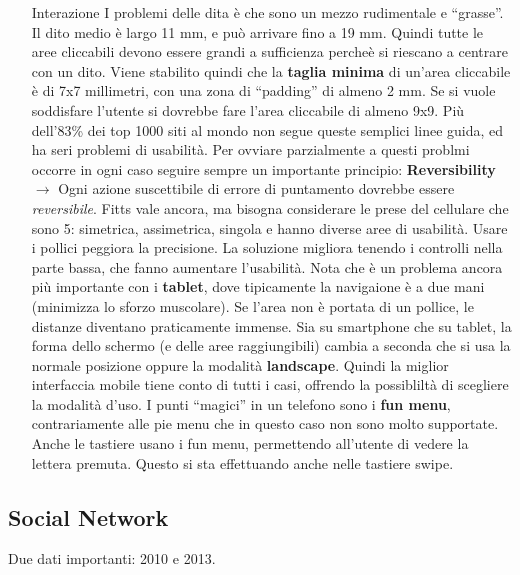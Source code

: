 \begin{enumerate}

\item[Interazione] I problemi delle dita \`e che sono un mezzo rudimentale e ``grasse''. Il dito medio \`e largo 11 mm, e pu\`o arrivare fino a 19 mm. Quindi tutte le aree cliccabili devono essere grandi a sufficienza perche\`e si riescano a centrare con un dito. Viene stabilito quindi che la \textbf{taglia minima} di un'area cliccabile \`e di 7x7 millimetri, con una zona di ``padding'' di almeno 2 mm. Se si vuole soddisfare l'utente si dovrebbe fare l'area cliccabile di almeno 9x9. Pi\`u dell'83\% dei top 1000 siti al mondo non segue queste semplici linee guida, ed ha seri problemi di usabilit\`a. Per ovviare parzialmente a questi problmi occorre in ogni caso seguire sempre un importante principio: \textbf{Reversibility} $\to$ Ogni azione suscettibile di errore di puntamento dovrebbe essere \textit{reversibile}.
  Fitts vale ancora, ma bisogna considerare le prese del cellulare che sono 5: simetrica, assimetrica, singola e hanno diverse aree di usabilit\`a. Usare i pollici peggiora la precisione. La soluzione migliora tenendo i controlli nella parte bassa, che fanno aumentare l'usabilit\`a. Nota che \`e un problema ancora pi\`u importante con i \textbf{tablet}, dove tipicamente la navigaione \`e a due mani (minimizza lo sforzo muscolare). Se l'area non \`e portata di un pollice, le distanze diventano praticamente immense. Sia su smartphone che su tablet, la forma dello schermo (e delle aree raggiungibili) cambia a seconda che si usa la normale posizione oppure la modalit\`a \textbf{landscape}. Quindi la miglior interfaccia mobile tiene conto di tutti i casi, offrendo la possiblilt\`a di scegliere la modalit\`a d'uso. I punti ``magici'' in un telefono sono i \textbf{fun menu}, contrariamente alle pie menu che in questo caso non sono molto supportate. Anche le tastiere usano i fun menu, permettendo all'utente di vedere la lettera premuta. Questo si sta effettuando anche nelle tastiere swipe.

\end{enumerate}

\subsection{Social Network}

Due dati importanti: 2010 e 2013.

